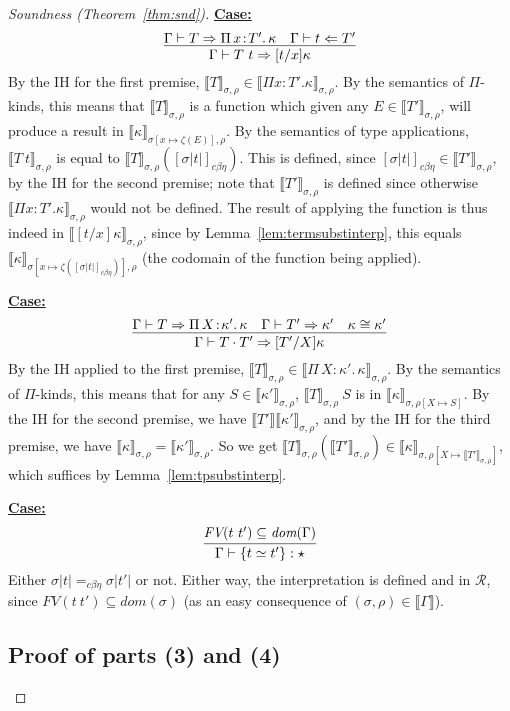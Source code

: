 \documentclass{article}
\newcommand{\choice}[0]{\zeta}
\newcommand{\abs}[4]{{#1}\, #2\! : \! #3.\, #4}
\newcommand{\interp}[1]{\llbracket #1 \rrbracket}
\newcommand{\tpcheck}[0]{\Leftarrow}
\newcommand{\tpsynth}[0]{\Rightarrow}
\newcommand{\cbe}[0]{c\beta\eta}
\newcommand{\startcase}[1]{\vspace{#1} \noindent\textbf{\underline{Case:}}}
\begin{document}
\begin{proof}[Soundness (Theorem~\ref{thm:snd})]
\startcase{.2cm}
\[
   \infer{\Gamma\vdash T\ t \tpsynth [t/x]\kappa}{\Gamma\vdash T \tpsynth \abs{\Pi}{x}{T'}{\kappa} & \Gamma\vdash t \tpcheck T'} 
\]
By the IH for the first premise,
$\interp{T}_{\sigma,\rho}\in\interp{\Pi x:T'.\kappa}_{\sigma,\rho}$.
By the semantics of $\Pi$-kinds, this means that
$\interp{T}_{\sigma,\rho}$ is a function which given any
$E\in\interp{T'}_{\sigma,\rho}$, will produce a result in
$\interp{\kappa}_{\sigma[x\mapsto \choice(E)],\rho}$.  By the
semantics of type applications, $\interp{T\ t}_{\sigma,\rho}$ is equal
to $\interp{T}_{\sigma,\rho}([\sigma |t|]_{\cbe})$.  This is defined,
since $[\sigma |t|]_{\cbe}\in\interp{T'}_{\sigma,\rho}$, by the IH for
the second premise; note that $\interp{T'}_{\sigma,\rho}$ is defined
since otherwise $\interp{\Pi x:T'.\kappa}_{\sigma,\rho}$ would not be defined.
The result of applying the function is thus indeed
in $\interp{[t/x]\kappa}_{\sigma,\rho}$, since by
Lemma~\ref{lem:termsubstinterp}, this equals
$\interp{\kappa}_{\sigma[x\mapsto \choice([\sigma |t|]_{\cbe})],\rho}$
(the codomain of the function being applied).

\startcase{.2cm}
\[
\infer{\Gamma\vdash T\cdot T' \tpsynth [T'/X]\kappa}
      {\Gamma\vdash T \tpsynth \abs{\Pi}{X}{\kappa'}{\kappa} & \Gamma\vdash T' \tpsynth \kappa' & \kappa \cong \kappa'} 
\]
By the IH applied to the first premise,
$\interp{T}_{\sigma,\rho}\in\interp{\abs{\Pi}{X}{\kappa'}{\kappa}}_{\sigma,\rho}$.
By the semantics of $\Pi$-kinds, this means that for any
$S\in\interp{\kappa'}_{\sigma,\rho}$, $\interp{T}_{\sigma,\rho}\ S$ is in
$\interp{\kappa}_{\sigma,\rho[X\mapsto S]}$.  By the IH for the second premise, we have 
$\interp{T'}\interp{\kappa'}_{\sigma,\rho}$, and by the IH for the third premise,
we have $\interp{\kappa}_{\sigma,\rho} = \interp{\kappa'}_{\sigma,\rho}$.  So
we get $\interp{T}_{\sigma,\rho}(\interp{T'}_{\sigma,\rho})\in \interp{\kappa}_{\sigma,\rho[X\mapsto \interp{T'}_{\sigma,\rho}]}$,
which suffices by Lemma~\ref{lem:tpsubstinterp}.

\startcase{.2cm}
\[
    \infer{\Gamma\vdash \{ t \simeq t' \} : \star}{\textit{FV}(t\ t')\subseteq\textit{dom}(\Gamma)}
\]
Either $\sigma |t| =_{\cbe} \sigma |t'|$ or not.  Either way, the interpretation is defined and in $\mathcal{R}$, since
$\textit{FV}(t\ t')\subseteq\textit{dom}(\sigma)$ (as an easy consequence of $(\sigma,\rho)\in\interp{\Gamma}$).

\subsection{Proof of parts (3) and (4)}


\end{proof}
\end{document}
